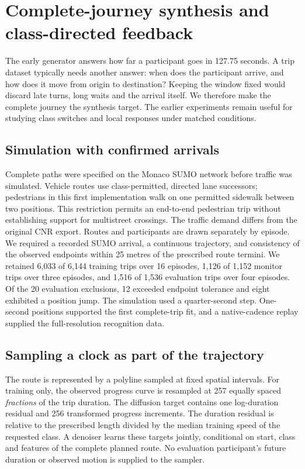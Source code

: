 \chapter{Complete-journey synthesis and class-directed feedback}
\label{ch:complete}
The early generator answers how far a participant goes in 127.75 seconds. A trip dataset typically needs another answer: when does the participant arrive, and how does it move from origin to destination? Keeping the window fixed would discard late turns, long waits and the arrival itself. We therefore make the complete journey the synthesis target. The earlier experiments remain useful for studying class switches and local responses under matched conditions.

\section{Simulation with confirmed arrivals}
Complete paths were specified on the Monaco SUMO network before traffic was simulated. Vehicle routes use class-permitted, directed lane successors; pedestrians in this first implementation walk on one permitted sidewalk between two positions. This restriction permits an end-to-end pedestrian trip without establishing support for multistreet crossings. The traffic demand differs from the original CNR export. Routes and participants are drawn separately by episode. We required a recorded SUMO arrival, a continuous trajectory, and consistency of the observed endpoints within 25 metres of the prescribed route termini. We retained 6,033 of 6,144 training trips over 16 episodes, 1,126 of 1,152 monitor trips over three episodes, and 1,516 of 1,536 evaluation trips over four episodes. Of the 20 evaluation exclusions, 12 exceeded endpoint tolerance and eight exhibited a position jump. The simulation used a quarter-second step. One-second positions supported the first complete-trip fit, and a native-cadence replay supplied the full-resolution recognition data.

\section{Sampling a clock as part of the trajectory}
The route is represented by a polyline sampled at fixed spatial intervals. For training only, the observed progress curve is resampled at 257 equally spaced \emph{fractions} of the trip duration. The diffusion target contains one log-duration residual and 256 transformed progress increments. The duration residual is relative to the prescribed length divided by the median training speed of the requested class. A denoiser learns these targets jointly, conditional on start, class and features of the complete planned route. No evaluation participant's future duration or observed motion is supplied to the sampler.

